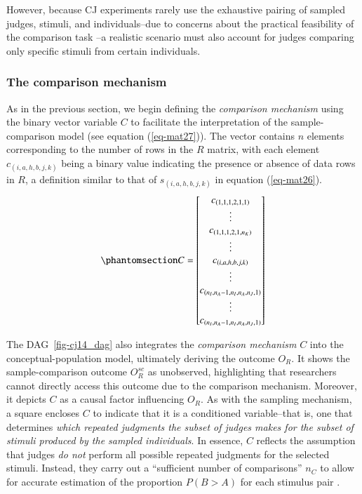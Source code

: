 \documentclass[
  authoryear,
  review,
  1p]{elsarticle}
\begin{document}
However, because CJ experiments rarely use the exhaustive pairing of
sampled judges, stimuli, and individuals--due to concerns about the
practical feasibility of the comparison task
\citep{Boonen_et_al_2020}--a realistic scenario must also account for
judges comparing only specific stimuli from certain individuals.

\subsubsection{The comparison
mechanism}\label{sec-theory-theoretical_SC2}

As in the previous section, we begin defining the \emph{comparison
mechanism} using the binary vector variable \(C\) to facilitate the
interpretation of the sample-comparison model (see equation
(\ref{eq-mat27})). The vector contains \(n\) elements corresponding to
the number of rows in the \(R\) matrix, with each element
\(c_{(i,a,h,b,j,k)}\) being a binary value indicating the presence or
absence of data rows in \(R\), a definition similar to that of
\(s_{(i,a,h,b,j,k)}\) in equation (\ref{eq-mat26}).
\begin{equation}\phantomsection\label{eq-mat27}{
C = \begin{bmatrix}
c_{(1,1,1,2,1,1)} \\
\vdots \\
c_{(1,1,1,2,1,n_{K})} \\
\vdots \\
c_{(i,a,h,b,j,k)} \\
\vdots \\
c_{(n_{I},n_{A}-1,n_{I},n_{A},n_{J},1)} \\
\vdots \\
c_{(n_{I},n_{A}-1,n_{I},n_{A},n_{J},1)}
\end{bmatrix}
}\end{equation}

The DAG~\ref{fig-cj14_dag} also integrates the \emph{comparison
mechanism} \(C\) into the conceptual-population model, ultimately
deriving the outcome \(O_{R}\). It shows the sample-comparison outcome
\(O^{sc}_{R}\) as unobserved, highlighting that researchers cannot
directly access this outcome due to the comparison mechanism. Moreover,
it depicts \(C\) as a causal factor influencing \(O_{R}\). As with the
sampling mechanism, a square encloses \(C\) to indicate that it is a
conditioned variable--that is, one that determines \emph{which repeated
judgments the subset of judges makes for the subset of stimuli produced
by the sampled individuals}. In essence, \(C\) reflects the assumption
that judges \emph{do not} perform all possible repeated judgments for
the selected stimuli. Instead, they carry out a ``sufficient number of
comparisons'' \(n_{C}\) to allow for accurate estimation of the
proportion \(P(B>A)\) for each stimulus pair
\citep[pp.~267]{Thurstone_1927b}.
\end{document}
